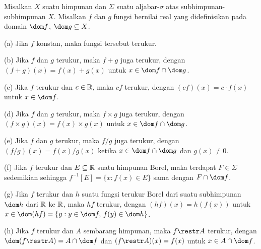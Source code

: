 Misalkan $X$ suatu himpunan dan $\Sigma$ suatu aljabar-$\sigma$
atas subhimpunan-subhimpunan $X$. Misalkan $f$ dan $g$ fungsi bernilai
real yang didefinisikan pada domain $\dom f$, $\dom g\subseteq X$.

(a) Jika $f$ konstan, maka fungsi tersebut terukur.

(b) Jika $f$ dan $g$ terukur, maka $f+g$ juga terukur, dengan
$(f+g)(x)=f(x)+g(x)$ untuk $x\in\dom f\cap\dom g$.

(c) Jika $f$ terukur dan $c\in\Bbb R$, maka $cf$ terukur, dengan
$(cf)(x)=c\cdot f(x)$ untuk $x\in \dom f$.

(d) Jika $f$ dan $g$ terukur, maka $f\times g$ juga terukur, dengan
$(f\times g)(x)=f(x)\times g(x)$ untuk
$x\in \dom f\cap\dom g$.

(e) Jika $f$ dan $g$ terukur, maka $f/g$ juga terukur, dengan
$(f/g)(x)=f(x)/g(x)$ ketika $x\in \dom f\cap\dom g$ dan $g(x)\ne 0$.

(f) Jika $f$ terukur dan $E\subseteq\Bbb R$ suatu himpunan Borel, maka
terdapat $F\in\Sigma$ sedemikian sehingga
$f^{-1}[E]=\{x:f(x)\in E\}$ sama dengan $F\cap\dom f$.

(g) Jika $f$ terukur dan $h$ suatu fungsi terukur Borel dari suatu
subhimpunan $\dom h$ dari $\Bbb R$ ke $\Bbb R$, maka $hf$ terukur,
dengan $(hf)(x)=h(f(x))$ untuk
$x\in\dom(hf)=\{y:y\in\dom f,\,f(y)\in\dom h\}$.

(h) Jika $f$ terukur dan $A$ sembarang himpunan, maka $f\restr A$
terukur, dengan $\dom(f\restr A)=A\cap\dom f$ dan
$(f\restr A)(x)=f(x)$ untuk $x\in A\cap\dom f$.

